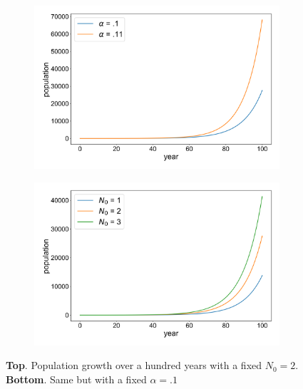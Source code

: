 \documentclass{article}
\begin{document}
\begin{figure}[!htb]
\centering
  \begin{subfigure}[b]{.7\textwidth}
     \includegraphics[width=1\linewidth]{fig1_report1.png}
  \end{subfigure}
  \begin{subfigure}[b]{.7\textwidth}
      \includegraphics[width=1\linewidth]{fig1_report2.png}
   \end{subfigure}
  \caption[growing population]{\textbf{Top}. Population growth over a hundred years with a fixed $N_0 = 2$. \textbf{Bottom}. Same but with a fixed $\alpha = .1$}\label{fig:1stmod}
 \end{figure}



\end{document}
